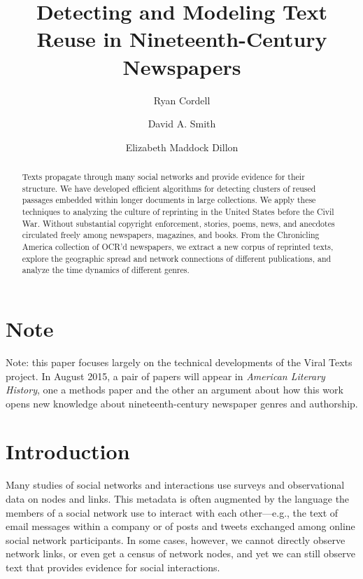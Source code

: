 \documentclass[pdftex,11pt]{article}
\begin{document}
\title{Detecting and Modeling Text Reuse in Nineteenth-Century Newspapers}

\author{Ryan Cordell \and David A. Smith \and Elizabeth Maddock Dillon}

\date{}

\maketitle


\begin{abstract}
  Texts propagate through many social networks and provide evidence
  for their structure.  We have developed efficient algorithms for detecting
  clusters of reused passages embedded within longer documents in
  large collections.  We apply these techniques to analyzing the
  culture of reprinting in the United States before the Civil War.
  Without substantial copyright enforcement, stories, poems, news, and
  anecdotes circulated freely among newspapers, magazines, and books.
  From the Chronicling America collection of OCR'd newspapers, we extract a new corpus of
  reprinted texts, explore the geographic spread and network
  connections of different publications, and analyze the time dynamics
  of different genres.
\end{abstract}

\section{Note}
\label{sec:A Note on the Whitepaper}
Note: this paper focuses largely on the technical developments of the Viral Texts project. In August 2015, a pair of papers will appear in \emph{American Literary History}, one a methods paper and the other an argument about how this work opens new knowledge about nineteenth-century newspaper genres and authorship.

\section{Introduction}
\label{sec:intro}
Many studies of social networks and interactions use surveys and
observational data on nodes and links.  This metadata is often
augmented by the language the members of a social network use to
interact with each other---e.g., the text of email messages within a
company or of posts and tweets exchanged among online social network
participants.  In some cases, however, we cannot directly observe
network links, or even get a census of network nodes, and yet we can
still observe text that provides evidence for social interactions.
\end{document}
